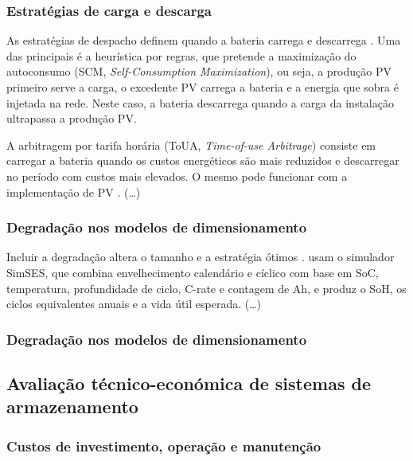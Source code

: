 \subsubsection{Estratégias de carga e descarga}
\label{sec:Ch2.4.3}

As estratégias de despacho definem quando a bateria carrega e descarrega \cite{Azuatalam2019}. Uma das principais é a heurística por regras, que pretende a maximização do autoconsumo (SCM, \textit{Self-Consumption Maximization}), ou seja, a produção PV primeiro serve a carga, o excedente PV carrega a bateria e a energia que sobra é injetada na rede. Neste caso, a bateria descarrega quando a carga da instalação ultrapassa a produção PV. 

A arbitragem por tarifa horária (ToUA, \textit{Time-of-use Arbitrage}) consiste em carregar a bateria quando os custos energéticos são mais reduzidos e descarregar no período com custos mais elevados. O mesmo pode funcionar com a implementação de PV \cite{Azuatalam2019}.
(…)



\subsubsection{Degradação nos modelos de dimensionamento }
\label{sec:Ch2.1.7.4}

Incluir a degradação altera o tamanho e a estratégia ótimos \cite{Azuatalam2019}. \textcite{Azuatalam2019} usam o simulador SimSES, que combina envelhecimento calendário e cíclico com base em SoC, temperatura, profundidade de ciclo, C-rate e contagem de Ah, e produz o SoH, os ciclos equivalentes anuais e a vida útil esperada.
(…)






\subsubsection{Degradação nos modelos de dimensionamento }
\label{sec:Ch2.1.7.6}



\subsection{Avaliação técnico-económica de sistemas de armazenamento}
\label{sec:Ch2.5}

\subsubsection{Custos de investimento, operação e manutenção }
\label{sec:Ch2.5.1}

